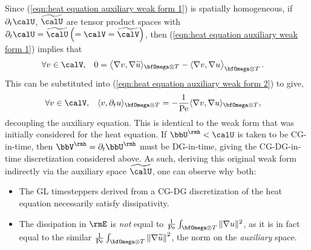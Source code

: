     Since (\ref{eqn:heat equation auxiliary weak form 1}) is spatially homogeneous, if $\partial_{t}\calU$, $\widetilde{\calU}$ are tensor product spaces with $\partial_{t}\calU  =  \widetilde{\calU}  \left(=  \calV  =  \widetilde{\calV}\right)$, then (\ref{eqn:heat equation auxiliary weak form 1}) implies that
    \begin{align}
        &\forall  v  \in  \calV,  &  0  &=  \left\langle\nabla v, \nabla\widetilde{u}\rangle_{\bfOmega\otimes T} - \langle\nabla v, \nabla u\right\rangle_{\bfOmega\otimes T}.
    \end{align}
    This can be substituted into (\ref{eqn:heat equation auxiliary weak form 2}) to give,
    \begin{align}
        &\forall  v  \in  \calV,  &  \langle v, \partial_{t}u\rangle_{\bfOmega\otimes T}  &=  - \frac{1}{\rmPe}\langle\nabla v, \nabla u\rangle_{\bfOmega\otimes T},
    \end{align}
    decoupling the auxiliary equation. This is identical to the weak form that was initially considered for the heat equation. If $\bbU^{\rmh}  <  \calU$ is taken to be CG-in-time, then $\bbV^{\rmh}  =  \partial_{t}\bbU^{\rmh}$ must be DG-in-time, giving the CG-DG-in-time discretization considered above. As such, deriving this original weak form indirectly via the auxiliary space $\widetilde{\calU}$, one can observe why both:
    \begin{itemize}
        \item  The GL timesteppers derived from a CG-DG discretization of the heat equation necessarily satisfy dissipativity.
        \item  The dissipation in $\rmE$ is \emph{not} equal to $\frac{1}{\rmPe}\int_{\bfOmega\otimes T}\|\nabla u\|^{2}$, as it is in fact equal to the similar $\frac{1}{\rmPe}\int_{\bfOmega\otimes T}\left\|\nabla\widetilde{u}\right\|^{2}$, the norm on the \emph{auxiliary} space.
    \end{itemize}
    